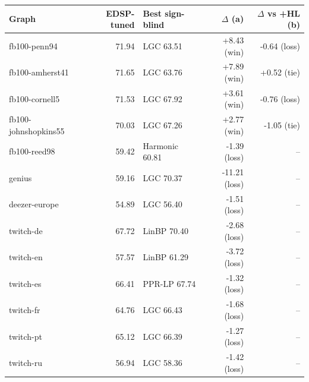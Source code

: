 \begin{tabular}{lrlrr}
\toprule
Graph & EDSP-tuned & Best sign-blind & $\Delta$ (a) & $\Delta$ vs +HL (b) \\
\midrule
fb100-penn94 & 71.94 & LGC 63.51 & +8.43 (win) & -0.64 (loss) \\
fb100-amherst41 & 71.65 & LGC 63.76 & +7.89 (win) & +0.52 (tie) \\
fb100-cornell5 & 71.53 & LGC 67.92 & +3.61 (win) & -0.76 (loss) \\
fb100-johnshopkins55 & 70.03 & LGC 67.26 & +2.77 (win) & -1.05 (tie) \\
fb100-reed98 & 59.42 & Harmonic 60.81 & -1.39 (loss) & -- \\
genius & 59.16 & LGC 70.37 & -11.21 (loss) & -- \\
deezer-europe & 54.89 & LGC 56.40 & -1.51 (loss) & -- \\
twitch-de & 67.72 & LinBP 70.40 & -2.68 (loss) & -- \\
twitch-en & 57.57 & LinBP 61.29 & -3.72 (loss) & -- \\
twitch-es & 66.41 & PPR-LP 67.74 & -1.32 (loss) & -- \\
twitch-fr & 64.76 & LGC 66.43 & -1.68 (loss) & -- \\
twitch-pt & 65.12 & LGC 66.39 & -1.27 (loss) & -- \\
twitch-ru & 56.94 & LGC 58.36 & -1.42 (loss) & -- \\
\bottomrule
\end{tabular}
